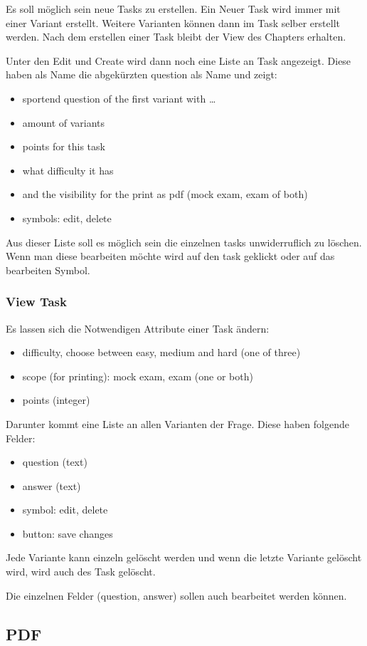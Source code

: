 \documentclass[a4paper]{article}
\begin{document}
Es soll möglich sein neue Tasks zu erstellen. Ein Neuer Task wird immer mit einer Variant erstellt. Weitere Varianten können dann im Task selber erstellt werden. Nach dem erstellen einer Task bleibt der View des Chapters erhalten.

Unter den Edit und Create wird dann noch eine Liste an Task angezeigt. Diese haben als Name die abgekürzten question als Name und zeigt:

\begin{itemize}
    \item sportend question of the first variant with \dots
    \item amount of variants
    \item points for this task
    \item what difficulty it has
    \item and the visibility for the print as pdf (mock exam, exam of both)
    \item symbols: edit, delete
\end{itemize}

Aus dieser Liste soll es möglich sein die einzelnen tasks unwiderruflich zu löschen. Wenn man diese bearbeiten möchte wird auf den task geklickt oder auf das bearbeiten Symbol.

\subsubsection{View Task}

Es lassen sich die Notwendigen Attribute einer Task ändern:

\begin{itemize}
    \item difficulty, choose between easy, medium and hard (one of three)
    \item scope (for printing): mock exam, exam (one or both)
    \item points (integer)
\end{itemize}

Darunter kommt eine Liste an allen Varianten der Frage. Diese haben folgende Felder:

\begin{itemize}
    \item question (text)
    \item answer (text)
    \item symbol: edit, delete
    \item button: save changes
\end{itemize}

Jede Variante kann einzeln gelöscht werden und wenn die letzte Variante gelöscht wird, wird auch des Task gelöscht.

Die einzelnen Felder (question, answer) sollen auch bearbeitet werden können.

\subsection{PDF}
\end{document}
